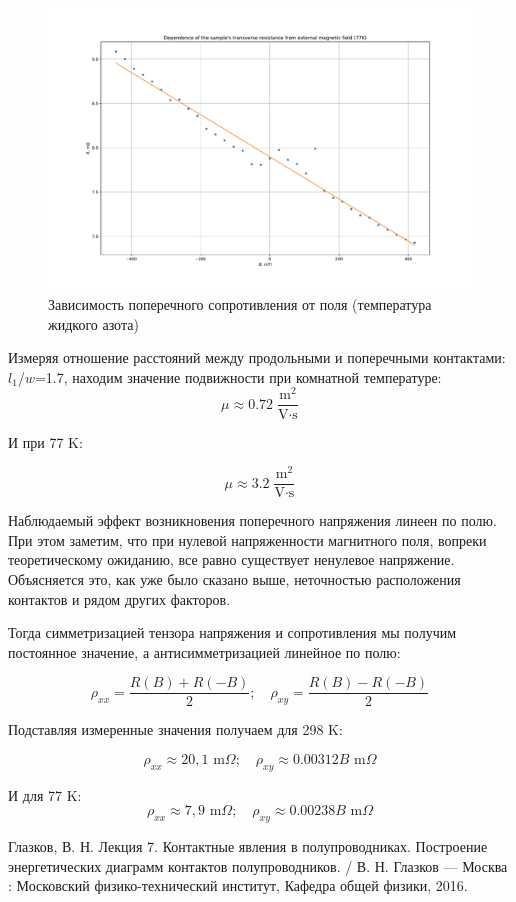 \documentclass[a4paper, 12pt]{article}
\begin{document}
\begin{figure}[H]
	\centering
	\includegraphics[width=0.8\linewidth]{3_cold.pdf}
	\caption{Зависимость поперечного  сопротивления от поля (температура жидкого азота)}
	\label{fig:3_cold}
\end{figure}

Измеряя отношение расстояний между продольными и поперечными контактами: $l_1$/$w$=1.7, находим значение подвижности при комнатной температуре:
$$\mu\approx 0.72  \; \frac{\text{m}^2}{\text{V} \cdot \text{s}}$$

И при 77 K:

$$\mu\approx 3.2   \; \frac{\text{m}^2}{\text{V} \cdot \text{s}}$$

Наблюдаемый эффект возникновения поперечного напряжения линеен по полю. При этом заметим, что при нулевой напряженности магнитного поля, вопреки теоретическому ожиданию, все равно существует ненулевое напряжение. Объясняется это, как уже было сказано выше, неточностью расположения контактов и рядом других факторов. 

Тогда симметризацией тензора напряжения и сопротивления мы получим постоянное значение, а антисимметризацией линейное по полю:

$$ \rho_{xx}=\frac{R(B)+R(-B)}{2};\quad \rho_{xy}=\frac{R(B)-R(-B)}{2}$$

Подставляя измеренные значения получаем для 298 K:

$$\rho_{xx}\approx 20,1 \text{ m$\Omega$}; \quad \rho_{xy}\approx0.00312B \text{ m$\Omega$}$$

И для 77 K:
$$\rho_{xx}\approx7,9 \text{ m$\Omega$}; \quad \rho_{xy}\approx0.00238B \text{ m$\Omega$}$$

\begin{thebibliography}{1}
	Глазков, В. Н. Лекция 7. Контактные явления в полупроводниках. Построение энергетических диаграмм контактов полупроводников. / В. Н. Глазков --- Москва : Московский физико-технический институт, Кафедра общей физики, 2016.
\end{thebibliography}
\end{document}
